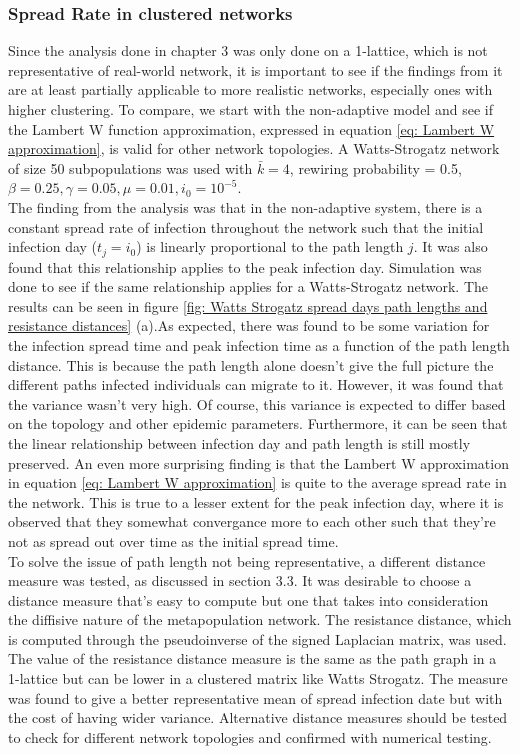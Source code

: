 \subsubsection{Spread Rate in clustered networks}
Since the analysis done in chapter 3 was only done on a 1-lattice, which is not representative of real-world network, it is important to see if the findings from it are at least partially applicable to more realistic networks, especially ones with higher clustering. To compare, we start with the non-adaptive model and see if the Lambert W function approximation, expressed in equation \ref{eq: Lambert W approximation}, is valid for other network topologies. A Watts-Strogatz network of size 50 subpopulations was used with $\bar k=4$, rewiring probability = 0.5, $\beta=0.25,\gamma=0.05,\mu=0.01,i_0=10^{-5}$.\\

The finding from the analysis was that in the non-adaptive system, there is a constant spread rate of infection throughout the network such that the initial infection day ($t_j=i_0$) is linearly proportional to the path length $j$. It was also found that this relationship applies to the peak infection day. Simulation was done to see if the same relationship applies for a Watts-Strogatz network. The results can be seen in figure \ref{fig: Watts Strogatz spread days path lengths and resistance distances} (a).As expected, there was found to be some variation for the infection spread time and peak infection time as a function of the path length distance. This is because the path length alone doesn't give the full picture the different paths infected individuals can migrate to it. However, it was found that the variance wasn't very high. Of course, this variance is expected to differ based on the topology and other epidemic parameters. Furthermore, it can be seen that the linear relationship between infection day and path length is still mostly preserved. An even more surprising finding is that the Lambert W approximation in equation \ref{eq: Lambert W approximation} is quite to the average spread rate in the network. This is true to a lesser extent for the peak infection day, where it is observed that they somewhat convergance more to each other such that they're not as spread out over time as the initial spread time.\\

To solve the issue of path length not being representative, a different distance measure was tested, as discussed in section 3.3. It was desirable to choose a distance measure that's easy to compute but one that takes into consideration the diffisive nature of the metapopulation network. The resistance distance, which is computed through the pseudoinverse of the signed Laplacian matrix, was used\cite{xiao2003resistance}. The value of the resistance distance measure is the same as the path graph in a 1-lattice but can be lower in a clustered matrix like Watts Strogatz. The measure was found to give a better representative mean of spread infection date but with the cost of having wider variance. Alternative distance measures should be tested to check for different network topologies and confirmed with numerical testing.

